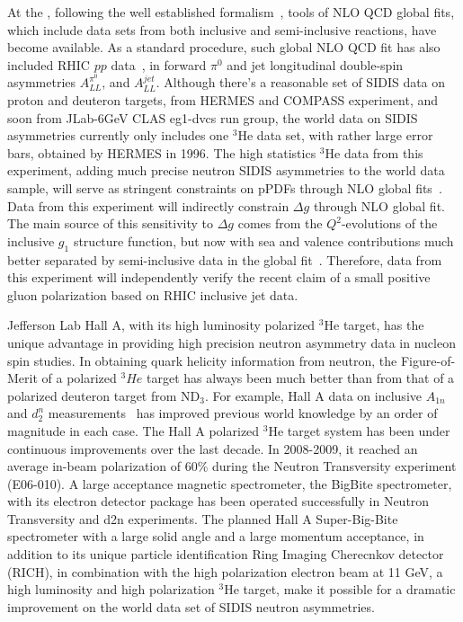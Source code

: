 At the \nloo, following the well established formalism~\cite{PhysRevLett.101.072001},
tools of NLO QCD global fits, which include data sets from both inclusive and semi-inclusive reactions,
have become available.   As a standard procedure,  such global NLO QCD fit
has also included RHIC $pp$ data~\cite{deFlorian:2014yva}, in forward $\pi^0$ and jet longitudinal double-spin asymmetries $A_{LL}^{\pi^0}$, and $A_{LL}^{jet}$. 
Although there's a reasonable  set of SIDIS  data on proton and deuteron targets, from HERMES and COMPASS experiment, and soon from JLab-6GeV CLAS eg1-dvcs run group,  the world data on SIDIS asymmetries  currently only includes
one $^3$He data set, with rather large error bars, obtained by HERMES in 1996.
The high statistics $^3$He data from this experiment, adding much precise
 neutron SIDIS asymmetries to the world data sample,  
will serve as stringent constraints on pPDFs through NLO global fits~\cite{epjcxj2006}. 
Data from this experiment  will  indirectly constrain  $\Delta g$   through NLO global fit. 
The main source of this sensitivity to $\Delta g$ comes from 
the $Q^2$-evolutions of the inclusive $g_1$ structure function, but now with 
 sea and valence contributions much better
 separated by semi-inclusive data in the global fit~\cite{sassotnlo,epjcxj2006}.
Therefore,  data from this experiment will  independently verify 
the recent claim of a small positive gluon polarization based on RHIC inclusive jet data. 

Jefferson Lab Hall A, with its high luminosity polarized $^3$He target, has the unique
advantage in providing high precision neutron asymmetry data in nucleon spin studies. 
In obtaining quark helicity information from neutron,  the Figure-of-Merit of  a polarized $^3He$ target has always been much better than from that of a polarized deuteron target from ND$_3$.
For example, Hall A data on inclusive  $A_{1n}$ and $d_2^n$ measurements~\cite{A1N_PR}
has improved previous world knowledge by an order of magnitude in each case. 
The Hall A polarized $^3$He target system has been under continuous improvements over 
the last decade.  In 2008-2009, it reached an average in-beam polarization of 60$\%$  
during the Neutron Transversity experiment (E06-010).
A large acceptance magnetic spectrometer, the BigBite spectrometer, with its electron detector package
has been operated successfully in Neutron Transversity and d2n experiments. 
The planned Hall A Super-Big-Bite spectrometer with  a large solid angle and a large momentum acceptance, in addition to its unique particle identification Ring Imaging Cherecnkov  detector (RICH), 
in  combination with the high polarization electron beam at 11 GeV, 
a high luminosity and high polarization $^3$He target,  make it possible for a dramatic improvement on the world data set of 
SIDIS neutron asymmetries.


